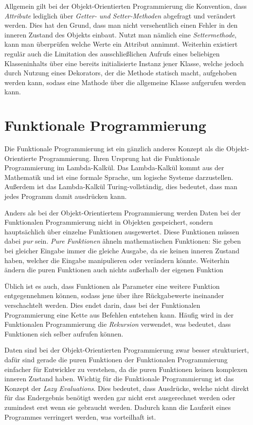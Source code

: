 \documentclass[]{dsadokumentation}
\begin{document}
Allgemein gilt bei der Objekt-Orientierten Programmierung die Konvention, dass \emph{Attribute} lediglich über \emph{Getter- und Setter-Methoden} abgefragt und verändert werden. Dies hat den Grund, dass man nicht versehentlich einen Fehler in den inneren Zustand des Objekts einbaut. Nutzt man nämlich eine \emph{Settermethode}, kann man überprüfen welche Werte ein Attribut annimmt. Weiterhin existiert regulär auch die Limitation des ausschließlichen Aufrufs eines beliebigen Klasseninhalts über eine bereits initialisierte Instanz jener Klasse, welche jedoch durch Nutzung eines Dekorators, der die Methode statisch macht, aufgehoben werden kann, sodass eine Mathode über die allgemeine Klasse aufgerufen werden kann.

\section{Funktionale Programmierung}
Die Funktionale Programmierung ist ein gänzlich anderes Konzept als die Objekt-Orientierte Programmierung. Ihren Ursprung hat die Funktionale Programmierung im Lambda-Kalkül. Das Lambda-Kalkül kommt aus der Mathematik und ist eine formale Sprache, um logische Systeme darzustellen. Außerdem ist das Lambda-Kalkül Turing-vollständig, dies bedeutet, dass man jedes Programm damit ausdrücken kann.

Anders als bei der Objekt-Orientiertem Programmierung werden Daten bei der Funktionalen Programmierung nicht in Objekten gespeichert, sondern hauptsächlich über einzelne Funktionen ausgewertet. Diese Funktionen müssen dabei \emph{pur} sein. \emph{Pure Funktionen} ähneln mathematischen Funktionen: Sie geben bei gleicher Eingabe immer die gleiche Ausgabe, da sie keinen inneren Zustand haben, welcher die Eingabe manipulieren oder verändern könnte. Weiterhin ändern die puren Funktionen auch nichts außerhalb der eigenen Funktion

Üblich ist es auch, dass Funktionen als Parameter eine weitere Funktion entgegennehmen können, sodass jene über ihre Rückgabewerte ineinander verschachtelt werden. Dies endet darin, dass bei der Funktionalen Programmierung eine Kette aus Befehlen entstehen kann. Häufig wird in der Funktionalen Programmierung die \emph{Rekursion} verwendet, was bedeutet, dass Funktionen sich selber aufrufen können.

Daten sind bei der Objekt-Orientierten Programmierung zwar besser strukturiert, dafür sind gerade die puren Funktionen der Funktionalen Programmierung einfacher für Entwickler zu verstehen, da die puren Funktionen keinen komplexen inneren Zustand haben. Wichtig für die Funktionale Programmierung ist das Konzept der \emph{Lazy Evaluations}. Dies bedeutet, dass Ausdrücke, welche nicht direkt für das Endergebnis benötigt werden gar nicht erst ausgerechnet werden oder zumindest erst wenn sie gebraucht werden. Dadurch kann die Laufzeit eines Programmes verringert werden, was vorteilhaft ist.
\end{document}

